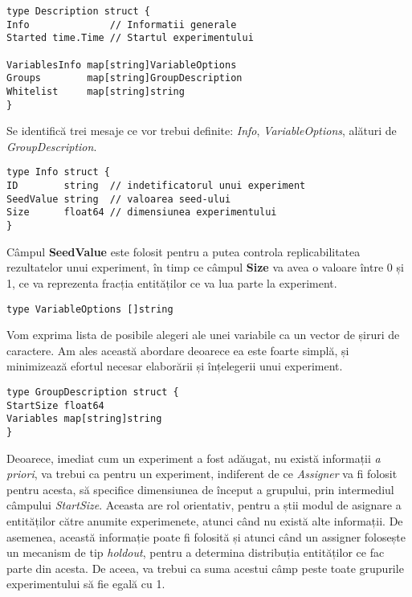 \begin{center}
	\begin{lstlisting}[language=Golang]
type Description struct {
Info              // Informatii generale
Started time.Time // Startul experimentului

VariablesInfo map[string]VariableOptions
Groups        map[string]GroupDescription
Whitelist     map[string]string
}
	\end{lstlisting}
\end{center}

Se identifică trei mesaje ce vor trebui definite: \textit{Info}, \textit{VariableOptions}, alături de \textit{GroupDescription}.
\begin{center}
	\begin{lstlisting}[language=Golang]
type Info struct {
ID        string  // indetificatorul unui experiment
SeedValue string  // valoarea seed-ului
Size      float64 // dimensiunea experimentului
}
	\end{lstlisting}
\end{center}

\begin{remark}
	Câmpul \textbf{SeedValue} este folosit pentru a putea controla replicabilitatea rezultatelor unui experiment, în timp ce câmpul \textbf{Size} va avea o valoare între 0 și 1, ce va reprezenta fracția entităților ce va lua parte la experiment.
\end{remark}

\begin{lstlisting}[language=Golang]
type VariableOptions []string
\end{lstlisting}

Vom exprima lista de posibile alegeri ale unei variabile ca un vector de șiruri de caractere. Am ales această abordare deoarece ea este foarte simplă, și minimizează efortul necesar elaborării și înțelegerii unui experiment.

\begin{center}
	\begin{lstlisting}[language=Golang]
type GroupDescription struct {
StartSize float64
Variables map[string]string
}
	\end{lstlisting}
\end{center}

Deoarece, imediat cum un experiment a fost adăugat, nu există informații \textit{a priori}, va trebui ca pentru un experiment, indiferent de ce \textit{Assigner} va fi folosit pentru acesta, să specifice dimensiunea de început a grupului, prin intermediul câmpului \textit{StartSize}. Aceasta are rol orientativ, pentru a știi modul de asignare a entităților către anumite experimenete, atunci când nu există alte informații. De asemenea, această informație poate fi folosită și atunci când un assigner folosește un mecanism de tip \textit{holdout}, pentru a determina distribuția entităților ce fac parte din acesta. De aceea, va trebui ca suma acestui câmp peste toate grupurile experimentului să fie egală cu 1.

